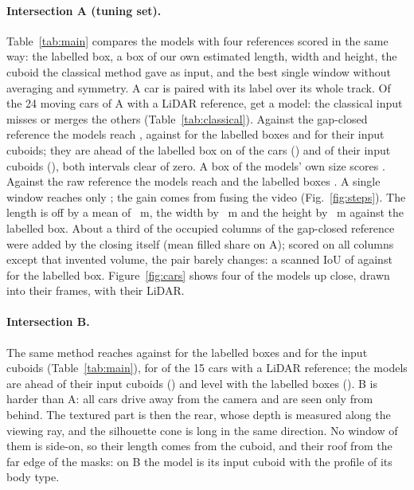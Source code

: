 \documentclass[runningheads,a4paper]{llncs}
\begin{document}
\paragraph{Intersection A (tuning set).} Table~\ref{tab:main} compares the models with four references scored in
the same way: the labelled box, a box of our own estimated length, width and height, the cuboid the classical method
gave as input, and the best single window without averaging and symmetry. A car is paired with its label over its
whole track. Of the 24 moving cars of A with a LiDAR reference, \ClsACars{} get a model: the classical input misses
or merges the others (Table~\ref{tab:classical}). Against the gap-closed reference the models reach \ClsAOurs{},
against \ClsALab{} for the labelled boxes and \ClsAInput{} for their input cuboids; they are ahead of the labelled box on \ClsAWinsLab{} of the \ClsACars{} cars (\ClsADLab{}) and of their input
cuboids (\ClsADInput{}), both intervals clear of zero.
A box of the models' own size scores \ClsAOwn{}. Against the raw reference the models reach \ClsAOursRaw{} and the
labelled boxes \ClsALabRaw{}. A single window reaches only \ClsASingle{}; the gain comes from fusing the video
(Fig.~\ref{fig:steps}). The length is off by a mean of \ClsALerr{}~m, the width by \ClsAWerr{}~m and the height by
\ClsAHerr{}~m against the labelled box. About a third of the occupied columns of the gap-closed reference were
added by the closing itself (mean filled share \ClsAFilled{} on A); scored on all columns except that invented
volume, the pair barely changes: a scanned IoU of \ClsAScanned{} against \ClsALabScanned{} for the labelled box.
Figure~\ref{fig:cars} shows four of the models up close, drawn into their frames, with their LiDAR.

\paragraph{Intersection B.} The same method reaches \ClsBOurs{} against \ClsBLab{} for the labelled boxes and
\ClsBInput{} for the input cuboids (Table~\ref{tab:main}), for \ClsBCars{} of the 15 cars with a LiDAR reference; the models are ahead of their input cuboids (\ClsBDInput{}) and level with the labelled boxes (\ClsBDLab{}). B
is harder than A: all cars drive away from the camera and are seen only from behind. The textured part is then the
rear, whose depth is measured along the viewing ray, and the silhouette cone is long in the same direction. No
window of them is side-on, so their length comes from the cuboid, and their roof from the far edge of the masks:
on B the model is its input cuboid with the profile of its body type.
\end{document}
